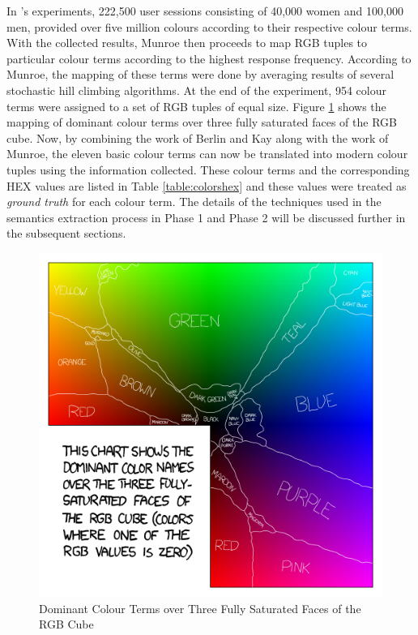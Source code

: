In 's experiments, 222,500 user sessions consisting of 40,000 women and 100,000 men, provided over five million colours according to their respective colour terms. With the collected results, Munroe then proceeds to map RGB tuples to particular colour terms according to the highest response frequency.
According to Munroe, the mapping of these terms were done by averaging results of several stochastic hill climbing algorithms. At the end of the experiment, 954 colour terms were assigned to a set of RGB tuples of equal size. Figure \ref{fig:xkcd} shows the mapping of dominant colour terms over three fully saturated faces of the RGB cube.
Now, by combining the work of Berlin and Kay along with the work of Munroe, the eleven basic colour terms can now be translated into modern colour tuples using the information collected. These colour terms and the corresponding HEX values are listed in Table \ref{table:colorshex} and these values were treated as \textit{ground truth} for each colour term.
The details of the techniques used in the semantics extraction process in Phase 1 and Phase 2 will be discussed further in the subsequent sections.

\begin{figure}[!hbt]\centering
\includegraphics[width=.6\textwidth]{image/general/xkcd.png}
\caption{Dominant Colour Terms over Three Fully Saturated Faces of the RGB Cube}
\label{fig:xkcd}
\end{figure}


